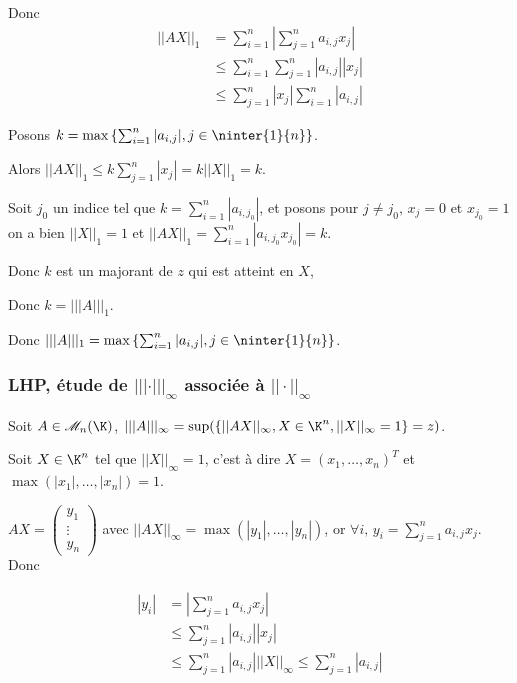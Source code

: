 Donc 
\begin{align*}
    || AX ||_1 & = \sum_{i=1}^n \left| \sum_{j=1}^n a_{i, j} x_j \right| \\
    & \leqslant \sum_{i=1}^n \sum_{j=1}^n |a_{i, j}| |x_j| \\
    & \leqslant \sum_{j=1}^n |x_j| \sum_{i=1}^n |a_{i, j}| 
\end{align*}


Posons $k = \max \left\{ \sum_{i=1}^n |a_{i, j}|, j \in \ninter{1}{n} \right\}$.

Alors $||AX||_1 \leqslant k \sum_{j=1}^n |x_j| = k ||X||_1 = k$.


Soit $j_0$ un indice tel que $k = \sum_{i=1}^n |a_{i, j_0}|$, et posons pour 
$j \neq j_0, \, x_j = 0$ et $x_{j_0} = 1$ on a bien $||X||_1 = 1$ et
$||AX||_1 = \sum_{i=1}^n |a_{i, j_0} x_{j_0}| = k$.

Donc $k$ est un majorant de $z$ qui est atteint en $X$,

Donc $k = |||A|||_1$.

Donc $|||A|||_1 = \max \left\{ \sum_{i=1}^n |a_{i, j}|, j \in \ninter{1}{n} \right\}$.


\subsubsection{LHP, étude de $||| \cdot |||_\infty$ associée à $|| \cdot ||_\infty$}

Soit $A \in \mathscr M_n(\K)$, $|||A|||_\infty = \sup (\{ ||AX||_\infty, X \in \K^n, ||X||_\infty = 1 \} = z) $.

Soit $X \in \K^n$ tel que $||X||_\infty = 1$, c'est à dire $X = (x_1, \ldots, x_n)^T$ et $\max(|x_1|, \ldots, |x_n|) = 1$.

$AX = \begin{pmatrix}
    y_1 \\
    \vdots \\
    y_n
\end{pmatrix}$  avec $||AX||_\infty = \max(|y_1|, \ldots, |y_n|)$, 
or $\displaystyle \forall i, \, y_i = \sum_{j=1}^n a_{i, j} x_j$. Donc 

\begin{align*}
    |y_i| & = \left| \sum_{j=1}^n a_{i, j} x_j \right| \\
    & \leqslant \sum_{j=1}^n |a_{i, j}| |x_j| \\
    & \leqslant \sum_{j=1}^n |a_{i, j}| ||X||_\infty \leqslant \sum_{j=1}^n |a_{i, j}|
\end{align*}

